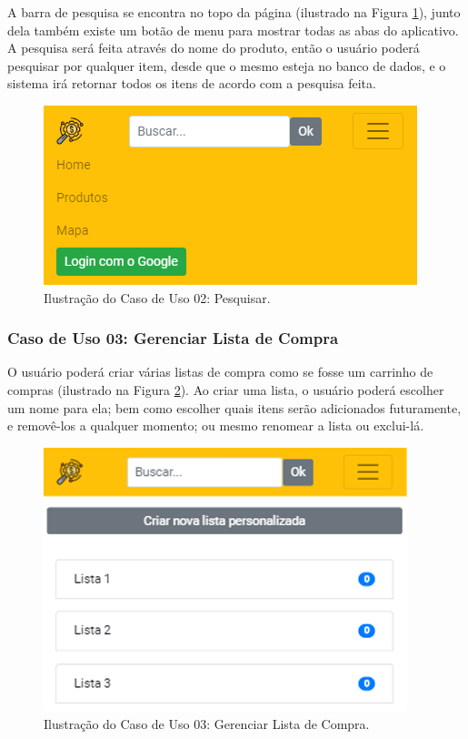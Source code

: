A barra de pesquisa se encontra no topo da página (ilustrado na Figura  \ref{fig:menu}), junto dela também existe um botão de menu para mostrar todas as abas do aplicativo. A pesquisa será feita através do nome do produto, então o usuário poderá pesquisar por qualquer item, desde que o mesmo esteja no banco de dados, e o sistema irá retornar todos os itens de acordo com a pesquisa feita.

\begin{figure}[H]
\centering
\includegraphics[width=\linewidth]{figuras/tela-menu.png}
\caption{Ilustração do Caso de Uso 02: Pesquisar.}
\label{fig:menu}
\end{figure}

\subsubsection{Caso de Uso 03: Gerenciar Lista de Compra}

O usuário poderá criar várias listas de compra como se fosse um carrinho de compras (ilustrado na Figura  \ref{fig:lista}). Ao criar uma lista, o usuário poderá escolher um nome para ela; bem como escolher quais itens serão adicionados futuramente, e removê-los a qualquer momento; ou mesmo renomear a lista ou exclui-lá.

\begin{figure}[H]
\centering
\includegraphics[width=\linewidth]{figuras/tela_lista_personalizada.png}
\caption{Ilustração do Caso de Uso 03: Gerenciar Lista de Compra.}
\label{fig:lista}
\end{figure}

